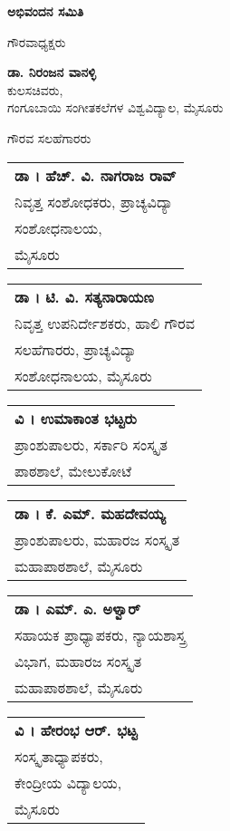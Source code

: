 \thispagestyle{empty}

\begin{center}
{\huge\bfseries ಅಭಿವಂದನ ಸಮಿತಿ}\\
\medskip

{\large ಗೌರವಾಧ್ಯಕ್ಷರು}
\bigskip

{\large\bfseries ಡಾ. ನಿರಂಜನ ವಾನಳ್ಳಿ }\\
ಕುಲಸಚಿವರು,\\
ಗಂಗೂಬಾಯಿ ಸಂಗೀತಕಲೆಗಳ ವಿಶ್ವವಿದ್ಯಾಲ, ಮೈಸೂರು
\end{center}

\centerline{{\large ಗೌರವ ಸಲಹೆಗಾರರು }}
\bigskip

\noindent
\begin{tabular}{@{}p{5cm}@{}}
{\large\bfseries ಡಾ । ಹೆಚ್. ವಿ. ನಾಗರಾಜ ರಾವ್}\\
ನಿವೃತ್ತ ಸಂಶೋಧಕರು, ಪ್ರಾಚ್ಯವಿದ್ಯಾ\\ ಸಂಶೋಧನಾಲಯ,\\ ಮೈಸೂರು  
\end{tabular}\hfill
\begin{tabular}{@{}p{5cm}@{}}
{\large\bfseries ಡಾ ।  ಟಿ. ವಿ. ಸತ್ಯನಾರಾಯಣ}\\
ನಿವೃತ್ತ ಉಪನಿರ್ದೇಶಕರು, ಹಾಲಿ ಗೌರವ\\ ಸಲಹೆಗಾರರು, ಪ್ರಾಚ್ಯವಿದ್ಯಾ\\ ಸಂಶೋಧನಾಲಯ, ಮೈಸೂರು 
\end{tabular}
\bigskip

\noindent
\begin{tabular}{@{}p{5cm}@{}}
{\large\bfseries ವಿ । ಉಮಾಕಾಂತ ಭಟ್ಟರು}\\
ಪ್ರಾಂಶುಪಾಲರು, ಸರ್ಕಾರಿ ಸಂಸ್ಕೃತ\\ 
ಪಾಠಶಾಲೆ, ಮೇಲುಕೋಟೆ
\end{tabular}\hfill
\begin{tabular}{@{}p{5cm}@{}}
{\large\bfseries ಡಾ । ಕೆ. ಎಮ್. ಮಹದೇವಯ್ಯ}\\
ಪ್ರಾಂಶುಪಾಲರು, ಮಹಾರಜ ಸಂಸ್ಕೃತ\\ ಮಹಾಪಾಠಶಾಲೆ, ಮೈಸೂರು
\end{tabular}
\bigskip

\noindent
\begin{tabular}{@{}p{5cm}@{}}
{\large\bfseries ಡಾ । ಎಮ್. ಎ. ಅಳ್ವಾರ್}\\
ಸಹಾಯಕ ಪ್ರಾಧ್ಯಾಪಕರು, ನ್ಯಾಯಶಾಸ್ತ್ರ\\ ವಿಭಾಗ, ಮಹಾರಜ ಸಂಸ್ಕೃತ\\ ಮಹಾಪಾಠಶಾಲೆ, ಮೈಸೂರು
\end{tabular}\hfill
\begin{tabular}{@{}p{5cm}@{}}
{\large\bfseries ವಿ । ಹೇರಂಭ ಆರ್. ಭಟ್ಟ}\\
ಸಂಸ್ಕೃತಾಧ್ಯಾಪಕರು,\\ ಕೇಂದ್ರೀಯ ವಿದ್ಯಾಲಯ,\\ ಮೈಸೂರು
\end{tabular}
\bigskip

